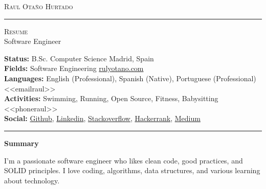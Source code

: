 \documentclass[10pt,A4]{article}
\newcommand{\cvsection}[1]
{
	\begin{center}
		\large\textcolor{sectcol}{\textbf{#1}}
	\end{center}
}
\newcommand{\metasection}[2]
{
\footnotesize{#2} \hspace*{\fill} \footnotesize{#1}\\[1pt]
}
\begin{document}



\vspace{-8pt}
\begin{center}
	\HUGE \textsc{Raul Otaño Hurtado} \textcolor{sectcol}{\rule[-1mm]{1mm}{0.9cm}} \textsc{Resume}\\[2pt]
	\small Software Engineer
\end{center}



\vspace{6pt}


\metasection{Madrid, Spain}{\textbf{Status:} B.Sc. Computer Science}
\metasection{\href{https://rulyotano.com}{rulyotano.com}}{\textbf{Fields:} Software Engineering} 
\metasection{<<emailraul>>}{\textbf{Languages:} English (Professional), Spanish (Native), Portuguese (Professional)}
\metasection{<<phoneraul>>}{\textbf{Activities:} Swimming, Running, Open Source, Fitness, Babysitting}
\metasection{}{\textbf{Social:} \href{https://github.com/rulyotano}{Github}, \href{https://www.linkedin.com/in/raulotanohurtado}{Linkedin}, \href{https://stackoverflow.com/users/1655482}{Stackoverflow}, \href{https://www.hackerrank.com/rulyotano}{Hackerrank}, \href{https://medium.com/@rulyotano}{Medium}}
\vspace{-2pt}
\textcolor{softcol}{\hrule}
\vspace{6pt}

\normalsize

\vspace{-6pt}
\cvsection{Summary}
I'm a passionate software engineer who likes clean code, good practices, and SOLID principles. I love coding, algorithms, data structures, and various learning about technology.\\
\end{document}
